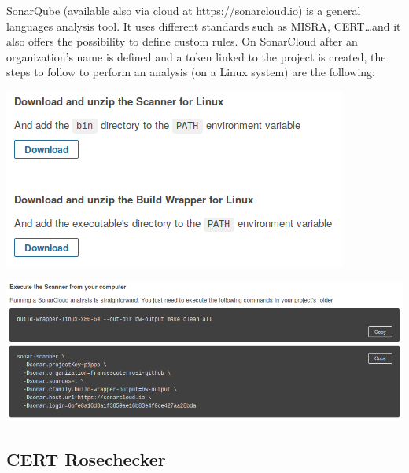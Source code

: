 SonarQube (available also via cloud at \url{https://sonarcloud.io}) is a general languages analysis tool. It uses different standards such as MISRA, CERT\dots and it also offers the possibility to define custom rules.\newline
On SonarCloud after an organization's name is defined and a token linked to the project is created, the steps to follow to perform an analysis (on a Linux system) are the following:
\vspace{1cm}

\begin{minipage}{\linewidth}
	\includegraphics[width=\textwidth]{img/sonarqube-init.png}
\end{minipage}

\begin{minipage}{\linewidth}
	\includegraphics[width=\textwidth]{img/sonarqube-scan.png}
\end{minipage}

\subsection{CERT Rosechecker}

